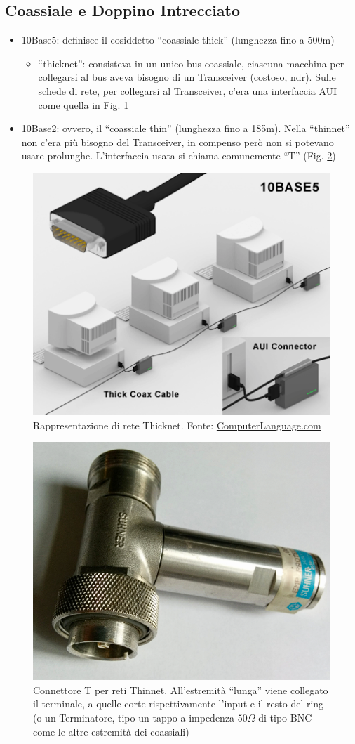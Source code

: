 \subsection*{Coassiale e Doppino Intrecciato}
\begin{itemize}
    \item 10Base5: definisce il cosiddetto ``coassiale thick'' (lunghezza fino a 500m)
    \begin{itemize}
        \item ``thicknet'': consisteva in un unico bus coassiale, ciascuna macchina per collegarsi al bus aveva bisogno di un Transceiver (costoso, ndr). Sulle schede di rete, per collegarsi al Transceiver, c'era una interfaccia AUI come quella in Fig. \ref{fig:06thicknet}
    \end{itemize}
    \item 10Base2: ovvero, il ``coassiale thin'' (lunghezza fino a 185m). Nella ``thinnet'' non c'era più bisogno del Transceiver, in compenso però non si potevano usare prolunghe. L'interfaccia usata si chiama comunemente ``T'' (Fig. \ref{fig:06T})
\end{itemize}

\begin{figure} [ht]
    \centering
    \includegraphics[width=0.6\linewidth]{Figures//06/thicknet.png}
    \caption{Rappresentazione di rete Thicknet. Fonte: \href{https://www.computerlanguage.com/results.php?definition=thick+Ethernet}{ComputerLanguage.com}}
    \label{fig:06thicknet}
\end{figure}
\begin{figure} [ht]
    \centering
    \includegraphics[width=0.5\linewidth]{Figures/06/Tconn.png}
    \caption{Connettore T per reti Thinnet. All'estremità ``lunga'' viene collegato il terminale, a quelle corte rispettivamente l'input e il resto del ring (o un Terminatore, tipo un tappo a impedenza $50\Omega$ di tipo BNC come le altre estremità dei coassiali)}
    \label{fig:06T}
\end{figure}

